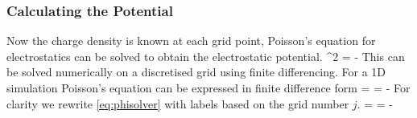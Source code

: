 \subsubsection{Calculating the Potential}
Now the charge density is known at each grid point, Poisson's equation for electrostatics can be solved to obtain the electrostatic potential.
\be
\nabla ^2 \psi  = -
\ee
This can be solved numerically on a discretised grid using finite differencing.
For a 1D simulation Poisson's equation can be expressed in finite difference form
\be 
{} =   = - 
\label{eq:phisolver}
\ee 
For clarity we rewrite \eqref{eq:phisolver} with labels based on the grid number $j$. 
\be 
{} =  = -
\label{eq:phisolver1}
\ee 

